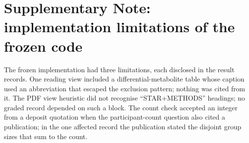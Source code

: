 \documentclass[sn-basic]{sn-jnl}
\begin{document}
\section*{Supplementary Note: implementation limitations of the frozen code}


The frozen implementation had three limitations, each disclosed in the result records. One reading view included a
differential-metabolite table whose caption used an abbreviation that escaped the exclusion pattern; nothing was cited
from it. The PDF view heuristic did not recognise ``STAR+METHODS'' headings; no graded record depended on such a
block. The count check accepted an integer from a deposit quotation when the participant-count question also cited a
publication; in the one affected record the publication stated the disjoint group sizes that sum to the count.

\clearpage
\end{document}
